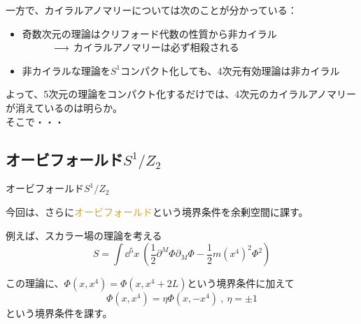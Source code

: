 \documentclass[
  unicode,a4paper,9pt,
  xcolor = {dvipsnames,svgnames},
  hyperref ={colorlinks=true,citecolor=Navy,linkcolor=NavyBlue,urlcolor=purple},
  ja=standard,lualatex
]{beamer}
\begin{document}
\begin{frame}

  一方で、カイラルアノマリーについては次のことが分かっている：

  \begin{itemize}
    \item 
    奇数次元の理論はクリフォード代数の性質から非カイラル\\
    $\hspace*{1cm}\ \longrightarrow\ $カイラルアノマリーは必ず相殺される
    \item 
    非カイラルな理論を$S^{1}$コンパクト化しても、4次元有効理論は非カイラル
  \end{itemize}

  \pause

  よって、5次元の理論をコンパクト化するだけでは、4次元のカイラルアノマリーが消えているのは明らか。\\

  そこで・・・  

\end{frame}

\subsection{オービフォールド\texorpdfstring{$S^{1}/Z_{2}$}{S1/Z2}}

\begin{frame}{オービフォールド$S^{1}/Z_{2}$}


  今回は、さらに\textcolor{Goldenrod}{オービフォールド}という境界条件を余剰空間に課す。
  
  \pause
  \vspace*{10pt}

  例えば、スカラー場の理論を考える
  \begin{equation}
    S
    =
    \int\dd^5 x\ 
    \left(  
      \frac{1}{2}\partial^{M}\Phi\partial_{M}\Phi
      -
      \frac{1}{2}m(x^{4})^2\Phi^2
    \right)
    \nonumber
  \end{equation}

  この理論に、$\Phi(x,x^{4})=\Phi(x,x^{4}+2L)$という境界条件に加えて
  \begin{equation}
    \Phi(x,x^{4})
    =
    \eta
    \Phi(x,-x^{4})
    \ ,\ 
    \eta=\pm 1
    \nonumber
  \end{equation}
  という境界条件を課す。  

\end{frame}
\end{document}

